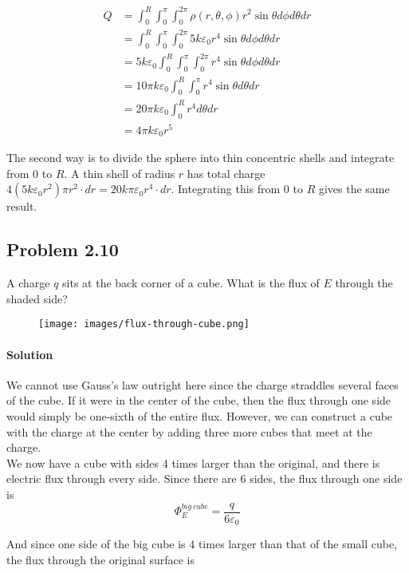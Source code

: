 \documentclass{article}
\begin{document}
\begin{align*}
    Q &= \int_0^R \int_0^{\pi} \int_0^{2\pi} \rho(r, \theta, \phi) r^2\sin\theta d\phi d\theta dr \\
    &= \int_0^R \int_0^{\pi} \int_0^{2\pi} 5k\varepsilon_0 r^4\sin\theta d\phi d\theta dr \\
    &= 5k\varepsilon_0  \int_0^R \int_0^{\pi} \int_0^{2\pi} r^4\sin\theta d\phi d\theta dr \\
    &= 10\pi k \varepsilon_0 \int_0^{R} \int_0^{\pi}  r^4 \sin\theta d\theta dr \\
    &= 20\pi k \varepsilon_0 \int_0^{R}  r^4 d\theta dr\\
    &= 4\pi k \varepsilon_0 r^5
\end{align*}

The second way is to divide the sphere into thin concentric shells and integrate from $0$ to $R$. A thin shell of radius $r$ has total charge $4(5k\varepsilon_0r^2) \pi r^2\cdot dr = 20k\pi\varepsilon_0r^4\cdot dr$. Integrating this from 0 to $R$ gives the same result. 

\newpage

\subsection*{Problem 2.10} 
A charge $q$ sits at the back corner of a cube. What is the flux of $E$ through the shaded side?

\begin{figure}[h]
    \centering
    \texttt{[image: images/flux-through-cube.png]}
\end{figure}

\paragraph{Solution} We cannot use Gauss's law outright here since the charge straddles several faces of the cube. If it were in the center of the cube, then the flux through one side would simply be one-sixth of the entire flux. However, we can construct a cube with the charge at the center by adding three more cubes that meet at the charge.\\

We now have a cube with sides 4 times larger than the original, and there is electric flux through every side. Since there are 6 sides, the flux through one side is 
$$
\Phi_E^{big \ cube} = \frac{q}{6\varepsilon_0}
$$

And since one side of the big cube is 4 times larger than that of the small cube, the flux through the original surface is 
\end{document}
